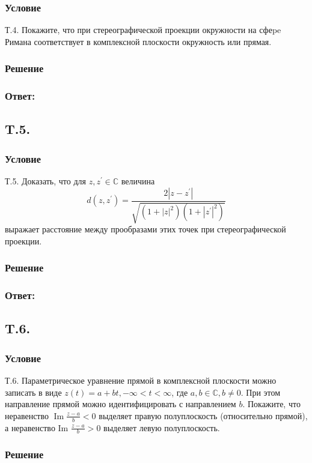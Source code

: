 \documentclass{article}
\begin{document}
\subsubsection*{Условие}
Т.4. Покажите, что при стереографической проекции окружности на сфеpe Римана соответствует в комплексной плоскости окружность или прямая.
\subsubsection*{Решение}
\subsubsection*{Ответ:}

\subsection{T.5.}
\subsubsection*{Условие}
Т.5. Доказать, что для $z, z^{\prime} \in \mathbb{C}$ величина
$$
d\left(z, z^{\prime}\right)=\frac{2\left|z-z^{\prime}\right|}{\sqrt{\left(1+|z|^{2}\right)\left(1+\left|z^{\prime}\right|^{2}\right)}}
$$
выражает расстояние между прообразами этих точек при стереографической проекции.
\subsubsection*{Решение} 
\subsubsection*{Ответ:}

\subsection{T.6.}
\subsubsection*{Условие}
Т.6. Параметрическое уравнение прямой в комплексной плоскости можно записать в виде $z(t)=a+b t,-\infty<t<\infty$, где $a, b \in \mathbb{C}, b \neq 0 .$ При
этом направление прямой можно идентифицировать с направлением $b .$ Покажите, что неравенство $\operatorname{Im} \frac{z-a}{b}<0$ выделяет правую полуплоскость (относительно прямой), а неравенство Im $\frac{z-a}{b}>0$ выделяет левую полуплоскость.
\subsubsection*{Решение}
\end{document}
